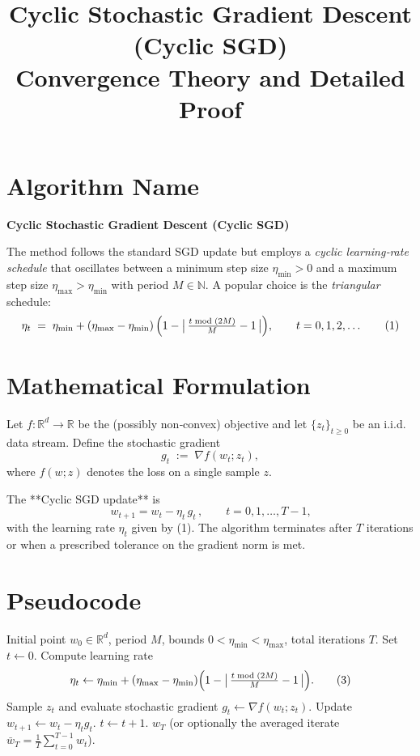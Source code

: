 \documentclass{article}
\begin{document}
\title{Cyclic Stochastic Gradient Descent (Cyclic SGD)\\
Convergence Theory and Detailed Proof}
\author{}
\date{}
\maketitle

\section*{Algorithm Name}
\textbf{Cyclic Stochastic Gradient Descent (Cyclic SGD)}  

The method follows the standard SGD update but employs a \emph{cyclic learning‑rate schedule} that oscillates between a minimum step size $\eta_{\min}>0$ and a maximum step size $\eta_{\max}> \eta_{\min}$ with period $M\in\mathbb{N}$.  
A popular choice is the \emph{triangular} schedule:
\[
\eta_t \;=\; \eta_{\min} + (\eta_{\max}-\eta_{\min})\,
\Bigl(1-\bigl|\,\tfrac{t\bmod (2M)}{M}-1\,\bigr|\Bigr),\qquad t=0,1,2,\dots
\tag{1}
\]

\section*{Mathematical Formulation}
Let $f:\mathbb{R}^d\to\mathbb{R}$ be the (possibly non‑convex) objective and let $\{z_t\}_{t\ge0}$ be an i.i.d. data stream.  
Define the stochastic gradient
\[
g_t \;:=\; \nabla f(w_t;z_t),
\]
where $f(w;z)$ denotes the loss on a single sample $z$.  

The **Cyclic SGD update** is
\[
\boxed{\,w_{t+1}=w_t-\eta_t\, g_t\,},\qquad t=0,1,\dots,T-1,
\tag{2}
\]
with the learning rate $\eta_t$ given by (1).  
The algorithm terminates after $T$ iterations or when a prescribed tolerance on the gradient norm is met.

\section*{Pseudocode}
\begin{algorithm}[H]
\caption{Cyclic SGD}
\begin{algorithmic}[1]
\Require Initial point $w_0\in\mathbb{R}^d$, period $M$, bounds $0<\eta_{\min}<\eta_{\max}$, total iterations $T$.
\State Set $t\gets0$.
    \State Compute learning rate
    \[
    \eta_t\gets \eta_{\min}+(\eta_{\max}-\eta_{\min})
    \Bigl(1-\bigl|\,\tfrac{t\bmod (2M)}{M}-1\,\bigr|\Bigr).
    \tag{3}
    \]
    \State Sample $z_t$ and evaluate stochastic gradient $g_t\gets \nabla f(w_t;z_t)$.
    \State Update $w_{t+1}\gets w_t-\eta_t g_t$.
    \State $t\gets t+1$.
\EndWhile
\State \Return $w_T$ (or optionally the averaged iterate $\bar w_T=\frac1T\sum_{t=0}^{T-1}w_t$).
\end{algorithmic}
\end{algorithm}
\end{document}
